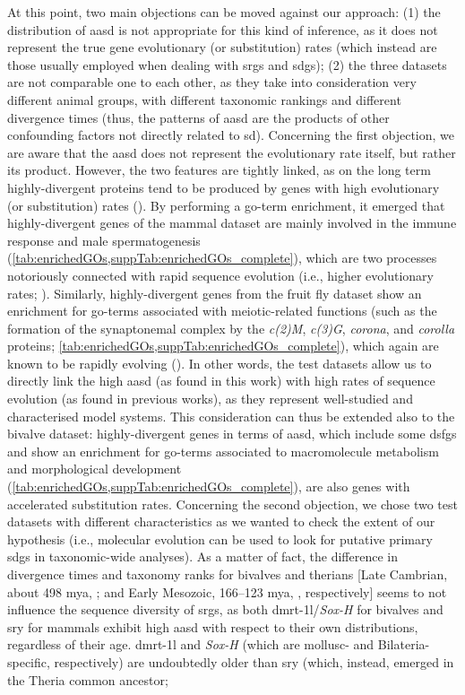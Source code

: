 At this point, two main objections can be moved against our approach: (1) the distribution of \gls{aasd} is not appropriate for this kind of inference, as it does not represent the true gene evolutionary (or substitution) rates (which instead are those usually employed when dealing with \glspl{srg} and \glspl{sdg}); (2) the three datasets are not comparable one to each other, as they take into consideration very different animal groups, with different taxonomic rankings and different divergence times (thus, the patterns of \gls{aasd} are the products of other confounding factors not directly related to \gls{sd}). Concerning the first objection, we are aware that the \gls{aasd} does not represent the evolutionary rate itself, but rather its product. However, the two features are tightly linked, as on the long term highly-divergent proteins tend to be produced by genes with high evolutionary (or substitution) rates (\textbf{\cite{echave2016causes}}). By performing a \gls{go}-term enrichment, it emerged that highly-divergent genes of the mammal dataset are mainly involved in the immune response and male spermatogenesis (\cref{tab:enrichedGOs,suppTab:enrichedGOs_complete}), which are two processes notoriously connected with rapid sequence evolution (i.e., higher evolutionary rates; \textbf{\cite{swanson2002rapid, murat2023molecular, vinkler2023understanding}}). Similarly, highly-divergent genes from the fruit fly dataset show an enrichment for \gls{go}-terms associated with meiotic-related functions (such as the formation of the synaptonemal complex by the \textit{c(2)M}, \textit{c(3)G}, \textit{corona}, and \textit{corolla} proteins; \cref{tab:enrichedGOs,suppTab:enrichedGOs_complete}), which again are known to be rapidly evolving (\textbf{\cite{hemmer2016holding}}). In other words, the test datasets allow us to directly link the high \gls{aasd} (as found in this work) with high rates of sequence evolution (as found in previous works), as they represent well-studied and characterised model systems. This consideration can thus be extended also to the bivalve dataset: highly-divergent genes in terms of \gls{aasd}, which include some \glspl{dsfg} and show an enrichment for \gls{go}-terms associated to macromolecule metabolism and morphological development (\cref{tab:enrichedGOs,suppTab:enrichedGOs_complete}), are also genes with accelerated substitution rates. Concerning the second objection, we chose two test datasets with different characteristics as we wanted to check the extent of our hypothesis (i.e., molecular evolution can be used to look for putative primary \glspl{sdg} in taxonomic-wide analyses). As a matter of fact, the difference in divergence times and taxonomy ranks for bivalves and therians [Late Cambrian, about 498 \gls{mya}, \textbf{\cite{song2023scaphopoda}}; and Early Mesozoic, 166--123 \gls{mya}, \textbf{\cite{alvarez2022species}}, respectively] seems to not influence the sequence diversity of \glspl{srg}, as both \gls{dmrt-1l}/\textit{Sox-H} for bivalves and \gls{sry} for mammals exhibit high \gls{aasd} with respect to their own distributions, regardless of their age. \gls{dmrt-1l} and \textit{Sox-H} (which are mollusc- and Bilateria-specific, respectively) are undoubtedly older than \gls{sry} (which, instead, emerged in the Theria common ancestor; 